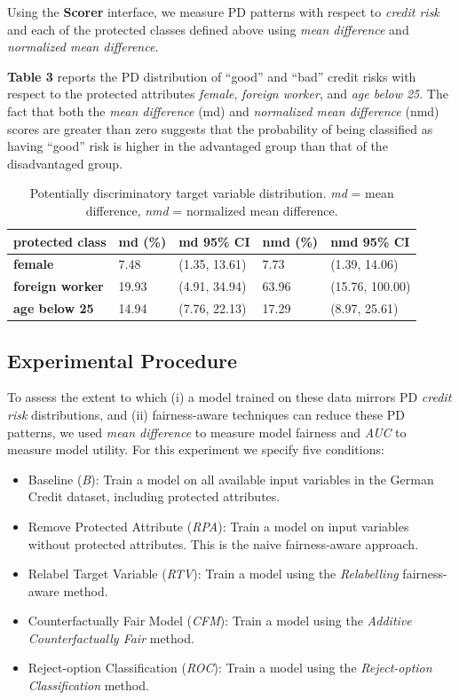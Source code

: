 \documentclass[man,natbib]{apa6}
\begin{document}
Using the \textbf{Scorer} interface, we measure PD patterns with respect to
\emph{credit risk} and each of the protected classes defined above using
\emph{mean difference} and \emph{normalized mean difference}.

\textbf{Table 3} reports the PD distribution of ``good'' and ``bad'' credit
risks with respect to the protected attributes \emph{female}, \emph{foreign
worker}, and \emph{age below 25}. The fact that both the \emph{mean difference}
(md) and \emph{normalized mean difference} (nmd) scores are greater than zero
suggests that the probability of being classified as having ``good'' risk is
higher in the advantaged group than that of the disadvantaged group.

\begin{table}
  \caption{Potentially discriminatory target variable distribution.
    \emph{md} = mean difference, \emph{nmd} = normalized mean difference.}
  \renewcommand{\arraystretch}{1.75}
  \small\noindent\begin{tabularx}{\linewidth}{l|X|X|X|X}
    \textbf{protected class} & \textbf{md (\%)} & \textbf{md 95\% CI} &
      \textbf{nmd (\%)} & \textbf{nmd 95\% CI}\\
    \hline
    \textbf{female} & 7.48 & (1.35, 13.61) & 7.73 & (1.39, 14.06) \\
    \textbf{foreign worker} & 19.93 & (4.91, 34.94) & 63.96 & (15.76, 100.00)\\
    \textbf{age below 25} & 14.94 & (7.76, 22.13) & 17.29 & (8.97, 25.61)\\
  \end{tabularx}
\end{table}

\subsection{Experimental Procedure}

To assess the extent to which (i) a model trained on these data mirrors PD
\emph{credit risk} distributions, and (ii) fairness-aware techniques can reduce
these PD patterns, we used \emph{mean difference} to measure model fairness and
\emph{AUC} to measure model utility. For this experiment we specify five
conditions:

\begin{itemize}
  \item Baseline (\emph{B}): Train a model on all available input variables in
        the German Credit dataset, including protected attributes.
  \item Remove Protected Attribute (\emph{RPA}): Train a model on input variables
        without protected attributes. This is the naive fairness-aware approach.
  \item Relabel Target Variable (\emph{RTV}): Train a model using the
        \emph{Relabelling} fairness-aware method.
  \item Counterfactually Fair Model (\emph{CFM}): Train a model using the
        \emph{Additive Counterfactually Fair} method.
  \item Reject-option Classification (\emph{ROC}): Train a model using the
        \emph{Reject-option Classification} method.
\end{itemize}
\end{document}
